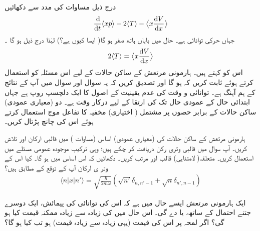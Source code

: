 \quad
 درج ذیل مساوات  کی مدد سے دکھائیں 
\begin{align}
\frac{\dif}{\dif t} \langle xp \rangle -2\langle T \rangle - \big\langle x \frac{\dif V}{\dif x} \big\rangle
\end{align}
جہاں  حرکی توانائی  ہے۔ حال میں بایاں ہاتھ صفر ہو گا( ایسا کیوں ہے؟) لہٰذا درج ذیل ہو گا ۔
\begin{align}
2\langle T \rangle = \big\langle x \frac{\dif V}{\dif x} \big\rangle
\end{align}
اس کو  کہتے ہیں۔ ہارمونی مرتعش کے ساکن حالات کے لیے اس مسئلہ کو استعمال کرتے ہوئے ثابت کریں کہ  ہو گا اور تصدیق کریں کہ یہ سوال اور سوال  میں آپ کے نتائج کے ہم آہنگ ہے۔
توانائی و وقت کی عدم یقینیت کے اصول کا ایک دلچسپ روپ  ہے جہاں ابتدائی حال  کے عمودی حال تک  کی ارتقا کے لیے درکار وقت  ہے۔ دو (معیاری عمودی) ساکن حالات کے برابر حصوں پر مشتمل ( اختیاری) مخفیہ کا تفاعل موج  استعمال کرتے ہوئے اس کی چانچ پڑتال کریں۔

ہارمونی مرتعش کے ساکن حالات کی (معیاری عمودی) اساس (مساوات ) میں قالبی ارکان  اور  تلاش کریں۔ آپ سوال  میں قالبی وتری رکن  دریافت کر چکے ہیں؛ وہی ترکیب موجودہ عمومی مسئلے میں استعمال کریں۔ متعلقہ( لامتناہی) قالب  اور   مرتب کریں۔ دکھائیں کہ اس اساس میں
 ہو گا۔ کیا اس کے وتر ی ارکان آپ کے توقع کے مطابق ہیں؟
\begin{align}
\langle n|x|n'\rangle=\sqrt{\frac{\hslash}{2m\omega}}(\sqrt{n'}\delta_{n,n'-1}+\sqrt{n}\delta_{n',n-1})
\end{align}

ایک ہارمونی مرتعش ایسے حال میں ہے کہ اس کی توانائی کی پیمائش، ایک دوسرے جتنے احتمال کے ساتھ،  یا  دے گی۔ اس حال میں  کی زیادہ سے زیادہ ممکنہ قیمت کیا ہو گی؟ اگر لمحہ  پر اس کی قیمت (یہی زیادہ سے زیادہ قیمت) ہو تب  کیا ہو گا؟

